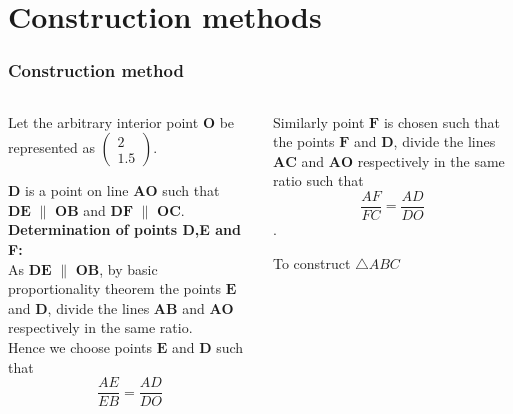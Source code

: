 \documentclass{beamer}
\renewcommand{\vec}[1]{\mathbf{#1}}
\begin{document}
\section*{Construction methods}
\begin{frame}[fragile]
\footnotesize
\frametitle{Construction method}
\begin{columns}
\begin{column}{0.5\textwidth}
      Let the arbitrary interior point $\vec{O}$ be represented as $\begin{pmatrix}2\\1.5\end{pmatrix}$.\quad

    $\vec{D}$ is a point on line $\vec{AO}$ such that \\$\vec{DE}$ $\parallel$ $\vec{OB}$ \quad and \quad $\vec{DF}$  $\parallel$  $\vec{OC}$.\\

\textbf{Determination of points D,E and F:}\\

As $\vec{DE}$ $\parallel$ $\vec{OB}$, by basic proportionality theorem the points $\vec{E}$ and $\vec{D}$, divide the lines $\vec{AB}$ and $\vec{AO}$ respectively in the same ratio.\\ 
Hence we choose points $\vec{E}$ and $\vec{D}$ such that \begin{equation}\frac{AE}{EB} = \frac{AD}{DO}\end{equation} 

  \end{column}
 
 
\begin{column}{0.5\textwidth}   
\quad Similarly point $\vec{F}$ is chosen such that the points $\vec{F}$ and $\vec{D}$, divide the lines $\vec{AC}$ and $\vec{AO}$ respectively in the same ratio such that \begin{equation}\frac{AF}{FC} = \frac{AD}{DO}\end{equation}.\\
  

\begin{table}[ht]
    \begin{center}
    
    \caption{To construct $\triangle ABC$}
   \label{table:table2}
   \end{center}	
\end{table}

 
    
\end{column}
\end{columns}
\end{frame}
\end{document}
